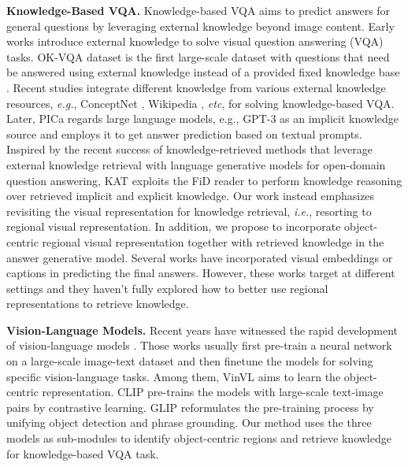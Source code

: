 \documentclass{article}
\begin{document}
\textbf{Knowledge-Based VQA. } Knowledge-based VQA \cite{marino2019ok} aims to predict answers for general questions by leveraging external knowledge beyond image content. Early works \cite{wang2015explicit,wang2017fvqa} introduce external knowledge to solve visual question answering (VQA) tasks. OK-VQA dataset \cite{marino2019ok} is the first large-scale dataset with questions that need be answered using external knowledge instead of a provided fixed knowledge base \cite{wang2017fvqa}. Recent studies \cite{wang2015explicit,wang2017fvqa,narasimhan2018straight,narasimhan2018out,zhu2020mucko,wu2021multi,marino2021krisp,yang2021empirical,gui2021kat} integrate different knowledge from various external knowledge resources, \textit{e.g.}, ConceptNet \cite{speer2017conceptnet}, Wikipedia \cite{vrandevcic2014wikidata}, \textit{etc}, for solving knowledge-based VQA. Later, PICa \cite{yang2021empirical} regards large language models, e.g., GPT-3 \cite{brown2020language} as an implicit knowledge source and employs it \cite{brown2020language} to get answer prediction based on textual prompts. Inspired by the recent success of knowledge-retrieved methods \cite{izacard2020leveraging,izacard2020distilling} that leverage external knowledge retrieval with language generative models for open-domain question answering, KAT \cite{gui2021kat} exploits the FiD reader \cite{izacard2020leveraging} to perform knowledge reasoning over retrieved implicit and explicit knowledge. Our work instead emphasizes revisiting the visual representation for knowledge retrieval, \textit{i.e.}, resorting to regional visual representation. In addition, we propose to incorporate object-centric regional visual representation together with retrieved knowledge in the answer generative model. Several works \cite{narasimhan2018out, garcia2020knowit,garcia2020knowledge, shah2019kvqa, narasimhan2018straight} have incorporated visual embeddings or captions in predicting the final answers. However, these works target at different settings and they haven't fully explored how to better use regional representations to retrieve knowledge.

\textbf{Vision-Language Models. } Recent years have witnessed the rapid development of vision-language models \cite{vaswani2017attention,jiang2022pseudo,yuan2021florence,su2019vl,li2020oscar,zhang2021vinvl,wang2021ufo, wang2021simvlm}. Those works usually first pre-train a neural network on a large-scale image-text dataset and then finetune the models for solving specific  vision-language tasks. Among them, VinVL \cite{zhang2021vinvl} aims to learn the object-centric representation. CLIP \cite{radford2021learning} pre-trains the models with large-scale text-image pairs by contrastive learning. GLIP \cite{yuan2021florence} reformulates the pre-training process by unifying object detection and phrase grounding. Our method uses the three models as sub-modules to identify object-centric regions and retrieve knowledge for knowledge-based VQA task.
\end{document}
